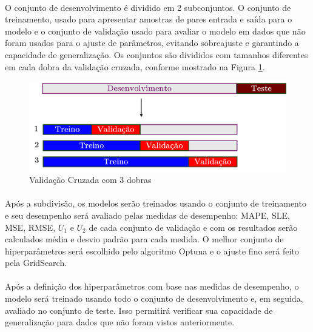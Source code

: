 \paragraph{} O conjunto de desenvolvimento é dividido em 2 subconjuntos. O conjunto de treinamento, usado para apresentar amostras de pares entrada e saída para o modelo e o conjunto de validação usado para avaliar o modelo em dados que não foram usados para o ajuste de parâmetros, evitando sobreajuste e garantindo a capacidade de generalização. Os conjuntos são divididos com tamanhos diferentes em cada dobra da validação cruzada, conforme mostrado na Figura \ref{fig:validacao_cruzada_teo}.

\begin{figure}
	\begin{center}
		\begin{center}
			\includegraphics[width=\textwidth]{figuras/validacao_cruzada_teo.png}
			\caption{Validação Cruzada com 3 dobras}
			\label{fig:validacao_cruzada_teo}
		\end{center}

	\end{center}
\end{figure}

\paragraph{} Após a subdivisão, os modelos serão treinados usando o conjunto de treinamento e seu desempenho será avaliado pelas medidas de desempenho: \ac{MAPE}, \ac{SLE}, \ac{MSE}, \ac{RMSE}, \(U_1\) e \(U_2\) de cada conjunto de validação e com os resultados serão calculados média e desvio padrão para cada medida. O melhor conjunto de hiperparâmetros será escolhido pelo algoritmo Optuna \cite{optuna_2019} e o ajuste fino será feito pela GridSearch.

\paragraph{} Após a definição dos hiperparâmetros com base nas medidas de desempenho, o modelo será treinado usando todo o conjunto de desenvolvimento e, em seguida, avaliado no conjunto de teste. Isso permitirá verificar sua capacidade de generalização para dados que não foram vistos anteriormente.